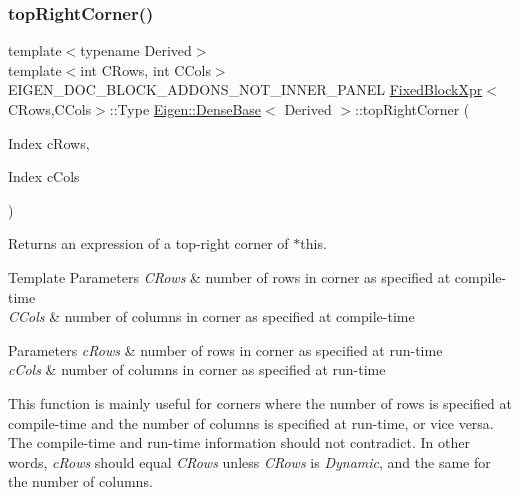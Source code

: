 \subsubsection{\texorpdfstring{topRightCorner()}{topRightCorner()}\hspace{0.1cm}{\footnotesize\ttfamily [3/3]}}
{\footnotesize\ttfamily template$<$typename Derived$>$ \\
template$<$int C\+Rows, int C\+Cols$>$ \\
E\+I\+G\+E\+N\+\_\+\+D\+O\+C\+\_\+\+B\+L\+O\+C\+K\+\_\+\+A\+D\+D\+O\+N\+S\+\_\+\+N\+O\+T\+\_\+\+I\+N\+N\+E\+R\+\_\+\+P\+A\+N\+EL \mbox{\hyperlink{struct_eigen_1_1_dense_base_1_1_fixed_block_xpr}{Fixed\+Block\+Xpr}}$<$C\+Rows,C\+Cols$>$\+::Type \mbox{\hyperlink{class_eigen_1_1_dense_base}{Eigen\+::\+Dense\+Base}}$<$ Derived $>$\+::top\+Right\+Corner (\begin{DoxyParamCaption}\item[{Index}]{c\+Rows,  }\item[{Index}]{c\+Cols }\end{DoxyParamCaption})\hspace{0.3cm}{\ttfamily [inline]}}

\begin{DoxyReturn}{Returns}
an expression of a top-\/right corner of $\ast$this.
\end{DoxyReturn}

\begin{DoxyTemplParams}{Template Parameters}
{\em C\+Rows} & number of rows in corner as specified at compile-\/time \\
\hline
{\em C\+Cols} & number of columns in corner as specified at compile-\/time \\
\hline
\end{DoxyTemplParams}

\begin{DoxyParams}{Parameters}
{\em c\+Rows} & number of rows in corner as specified at run-\/time \\
\hline
{\em c\+Cols} & number of columns in corner as specified at run-\/time\\
\hline
\end{DoxyParams}
This function is mainly useful for corners where the number of rows is specified at compile-\/time and the number of columns is specified at run-\/time, or vice versa. The compile-\/time and run-\/time information should not contradict. In other words, {\itshape c\+Rows} should equal {\itshape C\+Rows} unless {\itshape C\+Rows} is {\itshape Dynamic}, and the same for the number of columns.

